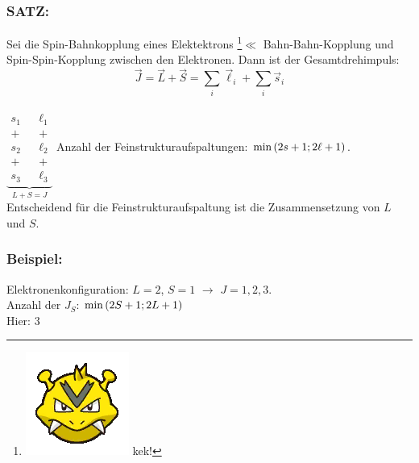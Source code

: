 \documentclass[Ex4_Zusammenfassung.tex]{subfiles}
\begin{document}
\subsubsection{SATZ:}
Sei die Spin-Bahnkopplung eines Elektektrons \footnote{\includegraphics[scale=0.4]{elektektron.png} kek!}$\ll$ Bahn-Bahn-Kopplung und Spin-Spin-Kopplung zwischen den Elektronen. 
Dann ist der Gesamtdrehimpuls: 
$$\vec{J} = \vec{L} + \vec{S} = \sum_i \vec{\ell}_i + \sum_i \vec{s}_i$$ \\
$ \underbrace{	
		\begin{matrix}
			s_1 & & \ell_1\\
			+ & & + \\
			s_2 & & \ell_2\\
			+ & & + \\
			s_3 & & \ell_3
		\end{matrix}
		}_{L + S = J} $
\qquad Anzahl der Feinstrukturaufspaltungen: $\min \left( 2s+1; 2\ell+1 \right) $.\\

Entscheidend für die Feinstrukturaufspaltung ist die Zusammensetzung von $L$ und $S$.

\subsubsection*{Beispiel:}
Elektronenkonfiguration: $L=2$, $S=1$ $\rightarrow$ $J=1, 2, 3$.\\
Anzahl der $J_S$: $\min \left( 2S+1; 2L+1 \right)$ \\
Hier: 3
\end{document}
